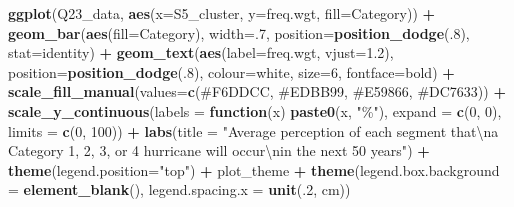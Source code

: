 \documentclass[
]{book}
\newenvironment{Shaded}{\begin{snugshade}}{\end{snugshade}}
\newcommand{\CharTok}[1]{\textcolor[rgb]{0.31,0.60,0.02}{#1}}
\newcommand{\ControlFlowTok}[1]{\textcolor[rgb]{0.13,0.29,0.53}{\textbf{#1}}}
\newcommand{\DataTypeTok}[1]{\textcolor[rgb]{0.13,0.29,0.53}{#1}}
\newcommand{\DecValTok}[1]{\textcolor[rgb]{0.00,0.00,0.81}{#1}}
\newcommand{\FloatTok}[1]{\textcolor[rgb]{0.00,0.00,0.81}{#1}}
\newcommand{\KeywordTok}[1]{\textcolor[rgb]{0.13,0.29,0.53}{\textbf{#1}}}
\newcommand{\NormalTok}[1]{#1}
\newcommand{\OperatorTok}[1]{\textcolor[rgb]{0.81,0.36,0.00}{\textbf{#1}}}
\newcommand{\StringTok}[1]{\textcolor[rgb]{0.31,0.60,0.02}{#1}}
\begin{document}
\begin{Shaded}
\begin{Highlighting}[]
\KeywordTok{ggplot}\NormalTok{(Q23\_data, }\KeywordTok{aes}\NormalTok{(}\DataTypeTok{x=}\NormalTok{S5\_cluster, }\DataTypeTok{y=}\NormalTok{freq.wgt, }\DataTypeTok{fill=}\NormalTok{Category)) }\OperatorTok{+}
\StringTok{  }\KeywordTok{geom\_bar}\NormalTok{(}\KeywordTok{aes}\NormalTok{(}\DataTypeTok{fill=}\NormalTok{Category), }\DataTypeTok{width=}\NormalTok{.}\DecValTok{7}\NormalTok{, }\DataTypeTok{position=}\KeywordTok{position\_dodge}\NormalTok{(.}\DecValTok{8}\NormalTok{), }\DataTypeTok{stat=}\StringTok{\textquotesingle{}identity\textquotesingle{}}\NormalTok{) }\OperatorTok{+}
\StringTok{  }\KeywordTok{geom\_text}\NormalTok{(}\KeywordTok{aes}\NormalTok{(}\DataTypeTok{label=}\NormalTok{freq.wgt, }\DataTypeTok{vjust=}\FloatTok{1.2}\NormalTok{), }\DataTypeTok{position=}\KeywordTok{position\_dodge}\NormalTok{(.}\DecValTok{8}\NormalTok{), }\DataTypeTok{colour=}\StringTok{\textquotesingle{}white\textquotesingle{}}\NormalTok{, }\DataTypeTok{size=}\DecValTok{6}\NormalTok{, }\DataTypeTok{fontface=}\StringTok{\textquotesingle{}bold\textquotesingle{}}\NormalTok{) }\OperatorTok{+}
\StringTok{  }\KeywordTok{scale\_fill\_manual}\NormalTok{(}\DataTypeTok{values=}\KeywordTok{c}\NormalTok{(}\StringTok{\textquotesingle{}\#F6DDCC\textquotesingle{}}\NormalTok{, }\StringTok{\textquotesingle{}\#EDBB99\textquotesingle{}}\NormalTok{, }\StringTok{\textquotesingle{}\#E59866\textquotesingle{}}\NormalTok{, }\StringTok{\textquotesingle{}\#DC7633\textquotesingle{}}\NormalTok{)) }\OperatorTok{+}
\StringTok{  }\KeywordTok{scale\_y\_continuous}\NormalTok{(}\DataTypeTok{labels =} \ControlFlowTok{function}\NormalTok{(x) }\KeywordTok{paste0}\NormalTok{(x, }\StringTok{"\%"}\NormalTok{), }\DataTypeTok{expand =} \KeywordTok{c}\NormalTok{(}\DecValTok{0}\NormalTok{, }\DecValTok{0}\NormalTok{), }\DataTypeTok{limits =} \KeywordTok{c}\NormalTok{(}\DecValTok{0}\NormalTok{, }\DecValTok{100}\NormalTok{)) }\OperatorTok{+}
\StringTok{  }\KeywordTok{labs}\NormalTok{(}\DataTypeTok{title =} \StringTok{"Average perception of each segment that}\CharTok{\textbackslash{}n}\StringTok{a Category 1, 2, 3, or 4 hurricane will occur}\CharTok{\textbackslash{}n}\StringTok{in the next 50 years"}\NormalTok{) }\OperatorTok{+}
\StringTok{  }\KeywordTok{theme}\NormalTok{(}\DataTypeTok{legend.position=}\StringTok{"top"}\NormalTok{) }\OperatorTok{+}
\StringTok{  }\NormalTok{plot\_theme }\OperatorTok{+}\StringTok{ }
\StringTok{  }\KeywordTok{theme}\NormalTok{(}\DataTypeTok{legend.box.background =} \KeywordTok{element\_blank}\NormalTok{(), }\DataTypeTok{legend.spacing.x =} \KeywordTok{unit}\NormalTok{(.}\DecValTok{2}\NormalTok{, }\StringTok{\textquotesingle{}cm\textquotesingle{}}\NormalTok{))}
\end{Highlighting}
\end{Shaded}
\end{document}
